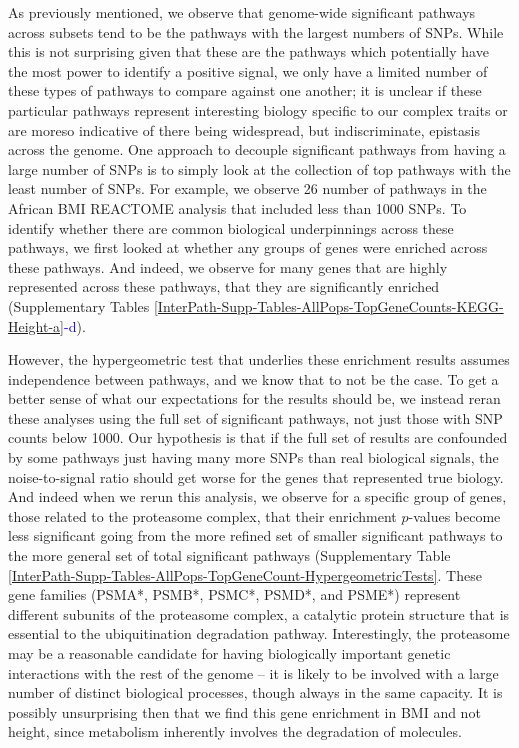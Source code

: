 \documentclass[12pt, a4paper]{article}
\begin{document}
As previously mentioned, we observe that genome-wide significant pathways across subsets tend to be the pathways with the largest numbers of SNPs. While this is not surprising given that these are the pathways which potentially have the most power to identify a positive signal, we only have a limited number of these types of pathways to compare against one another; it is unclear if these particular pathways represent interesting biology specific to our complex traits or are moreso indicative of there being widespread, but indiscriminate, epistasis across the genome. One approach to decouple significant pathways from having a large number of SNPs is to simply look at the collection of top pathways with the least number of SNPs. For example, we observe 26 number of pathways in the African BMI REACTOME analysis that included less than 1000 SNPs. To identify whether there are common biological underpinnings across these pathways, we first looked at whether any groups of genes were enriched across these pathways. And indeed, we observe for many genes that are highly represented across these pathways, that they are significantly enriched (Supplementary Tables \ref{InterPath-Supp-Tables-AllPops-TopGeneCounts-KEGG-Height-a}\textcolor{blue}{-d}).

However, the hypergeometric test that underlies these enrichment results assumes independence between pathways, and we know that to not be the case. To get a better sense of what our expectations for the results should be, we instead reran these analyses using the full set of significant pathways, not just those with SNP counts below 1000. Our hypothesis is that if the full set of results are confounded by some pathways just having many more SNPs than real biological signals, the noise-to-signal ratio should get worse for the genes that represented true biology. And indeed when we rerun this analysis, we observe for a specific group of genes, those related to the proteasome complex, that their enrichment $p$-values become less significant going from the more refined set of smaller significant pathways to the more general set of total significant pathways (Supplementary Table \ref{InterPath-Supp-Tables-AllPops-TopGeneCount-HypergeometricTests}. These gene families (PSMA*, PSMB*, PSMC*, PSMD*, and PSME*) represent different subunits of the proteasome complex, a catalytic protein structure that is essential to the ubiquitination degradation pathway. Interestingly, the proteasome may be a reasonable candidate for having biologically important genetic interactions with the rest of the genome -- it is likely to be involved with a large number of distinct biological processes, though always in the same capacity. It is possibly unsurprising then that we find this gene enrichment in BMI and not height, since metabolism inherently involves the degradation of molecules. 
\end{document}
